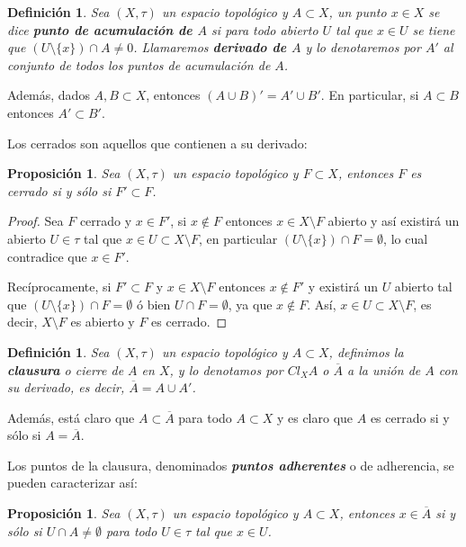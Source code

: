 \documentclass[12pt]{article}
\newtheorem{proposition}[theorem]{Proposición}
\newtheorem{definition}[theorem]{Definición}
\begin{document}
\begin{definition}Sea $(X, \tau)$ un espacio topológico y $A \subset X$, un punto $x \in X$ se dice \textbf{punto de acumulación de $A$} si para todo abierto $U$ tal que $x \in U$ se tiene que $(U \setminus \lbrace x \rbrace ) \cap A \neq 0$. Llamaremos \textbf{derivado de $A$} y lo denotaremos por $A'$ al conjunto de todos los puntos de acumulación de $A$.
\end{definition}

Además, dados $A,B \subset X$, entonces $(A \cup B)' = A' \cup B'$. En particular, si $A \subset B$ entonces $A' \subset B'$.

Los cerrados son aquellos que contienen a su derivado:

\begin{proposition}Sea $(X, \tau)$ un espacio topológico y $F \subset X$, entonces $F$ es cerrado si y sólo si $F' \subset F$.
\end{proposition}
\begin{proof}
Sea $F$ cerrado y $x \in F'$, si $x\notin F$ entonces $x \in X \setminus F$ abierto y así existirá un abierto $U \in \tau$ tal que $x \in U \subset X \setminus F$, en particular $(U \setminus \lbrace x \rbrace) \cap F = \emptyset$, lo cual contradice que $x \in F'$.

Recíprocamente, si $F' \subset F$ y $x \in X \setminus F$ entonces $x \notin F'$ y existirá un $U$ abierto tal que $(U \setminus \lbrace x \rbrace) \cap F = \emptyset$ ó bien $U \cap F = \emptyset$, ya que $x \notin F$. Así, $x \in U \subset X \setminus F$, es decir, $X\setminus F$ es abierto y $F$ es cerrado.

\end{proof}
\begin{definition}Sea $(X, \tau)$ un espacio topológico y $A \subset X$, definimos la \textbf{clausura} o cierre de $A$ en $X$, y lo denotamos por $Cl_X A$ o $\overline{A}$ a la unión de $A$ con su derivado, es decir, $\overline{A} = A \cup A'$.
\end{definition}

Además, está claro que $A \subset \overline{A}$ para todo $A \subset X$ y es claro que $A$ es cerrado si y sólo si $A = \overline{A}$.

Los puntos de la clausura, denominados \textbf{\textit{puntos adherentes}} o de adherencia, se pueden caracterizar así:

\begin{proposition}Sea $(X, \tau)$ un espacio topológico y $A \subset X$, entonces $x \in \overline{A}$ si y sólo si $U \cap A \neq \emptyset$ para todo $U \in \tau$ tal que $x \in U$.
\end{proposition}
\end{document}
